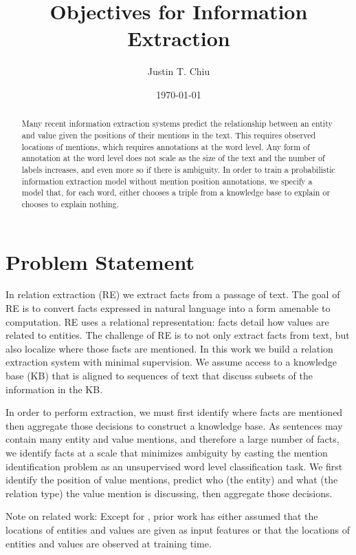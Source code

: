 \documentclass[12pt]{article}
\title{Objectives for Information Extraction}
\author{
Justin T. Chiu
}
\date{\today}
\begin{document}
\maketitle

\begin{abstract}
Many recent information extraction systems predict the relationship between
an entity and value given the positions of their mentions in the text.
This requires observed locations of mentions, which requires annotations at the word level.
Any form of annotation at the word level does not scale as the size of the text
and the number of labels increases, and even more so if there is ambiguity.
In order to train a probabilistic information extraction model without mention
position annotations, we specify a model that, for each word,
either chooses a triple from a knowledge base to explain or chooses to explain nothing.
\end{abstract}

\section{Problem Statement}

In relation extraction (RE) we extract facts from a passage of text.
The goal of RE is to convert facts expressed in natural language into a form
amenable to computation.
RE uses a relational representation: facts detail
how values are related to entities.
The challenge of RE is to not only extract facts from text, but also
localize where those facts are mentioned.
In this work we build a relation extraction system with minimal supervision.
We assume access to a knowledge base (KB) that is aligned to sequences of text
that discuss subsets of the information in the KB.

In order to perform extraction, we must first identify where facts are mentioned
then aggregate those decisions to construct a knowledge base.
As sentences may contain many entity and value mentions, and therefore 
a large number of facts, we identify facts at a scale that minimizes ambiguity
by casting the mention identification problem as an unsupervised word level classification task.
We first identify the position of value mentions,
predict who (the entity) and what (the relation type) the value mention
is discussing, then aggregate those decisions.

Note on related work:
Except for \citet{zeng2018copy}, prior work has either assumed that the locations of
entities and values are given as input features or that the locations of entities and values
are observed at training time.
\end{document}
